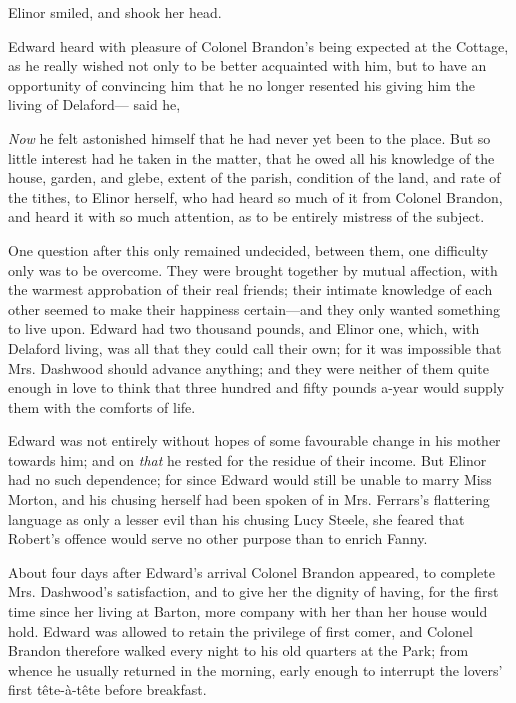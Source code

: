 Elinor smiled, and shook her head.

Edward heard with pleasure of Colonel Brandon's being expected at the Cottage, as he really wished not only to be better acquainted with him, but to have an opportunity of convincing him that he no longer resented his giving him the living of Delaford--- said he, 

{\em Now} he felt astonished himself that he had never yet been to the place. But so little interest had he taken in the matter, that he owed all his knowledge of the house, garden, and glebe, extent of the parish, condition of the land, and rate of the tithes, to Elinor herself, who had heard so much of it from Colonel Brandon, and heard it with so much attention, as to be entirely mistress of the subject.

One question after this only remained undecided, between them, one difficulty only was to be overcome. They were brought together by mutual affection, with the warmest approbation of their real friends; their intimate knowledge of each other seemed to make their happiness certain---and they only wanted something to live upon. Edward had two thousand pounds, and Elinor one, which, with Delaford living, was all that they could call their own; for it was impossible that Mrs. Dashwood should advance anything; and they were neither of them quite enough in love to think that three hundred and fifty pounds a-year would supply them with the comforts of life.

Edward was not entirely without hopes of some favourable change in his mother towards him; and on {\em that} he rested for the residue of their income. But Elinor had no such dependence; for since Edward would still be unable to marry Miss Morton, and his chusing herself had been spoken of in Mrs. Ferrars's flattering language as only a lesser evil than his chusing Lucy Steele, she feared that Robert's offence would serve no other purpose than to enrich Fanny.

About four days after Edward's arrival Colonel Brandon appeared, to complete Mrs. Dashwood's satisfaction, and to give her the dignity of having, for the first time since her living at Barton, more company with her than her house would hold. Edward was allowed to retain the privilege of first comer, and Colonel Brandon therefore walked every night to his old quarters at the Park; from whence he usually returned in the morning, early enough to interrupt the lovers' first tête-à-tête before breakfast.


